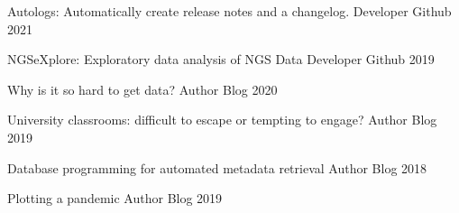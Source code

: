 

\begin{cvhonors}

  \cvhonor
    {Autologs: Automatically create release notes and a changelog.} %
    {Developer} %
    {Github} %
    {2021} %
    
  \cvhonor
    {NGSeXplore: Exploratory data analysis of NGS Data} %
    {Developer} %
    {Github} %
    {2019} %



 
    
\end{cvhonors}

\begin{cvhonors}
  \cvhonor
    {Why is it so hard to get data?} %
    {Author} %
    {Blog} %
    {2020} %
    
   \cvhonor
    {University classrooms: difficult to escape or tempting to engage?} %
    {Author} %
    {Blog} %
    {2019} %

   \cvhonor
    {Database programming for automated metadata retrieval} %
    {Author} %
    {Blog} %
    {2018} %
    
   \cvhonor
    {Plotting a pandemic} %
    {Author} %
    {Blog} %
    {2019} %

\end{cvhonors}